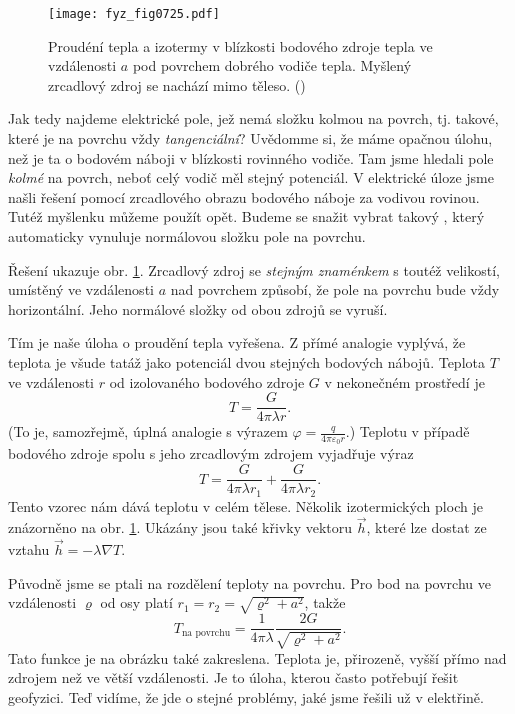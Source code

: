     \begin{figure}[ht!] %
      \centering
      \texttt{[image: fyz\_fig0725.pdf]}
      \caption{Proudéní tepla a izotermy v blízkosti bodového zdroje tepla ve vzdálenosti \(a\) pod
        povrchem dobrého vodiče tepla. Myšlený zrcadlový zdroj se nachází mimo těleso.
        (\cite[s.~210]{Feynman02})}
      \label{fyz:fig0725}
    \end{figure}

    Jak tedy najdeme elektrické pole, jež nemá složku kolmou na povrch, tj. takové, které je na
    povrchu vždy \emph{tangenciální}? Uvědomme si, že máme opačnou úlohu, než je ta o bodovém náboji
    v blízkosti rovinného vodiče. Tam jsme hledali pole \emph{kolmé} na povrch, neboť celý vodič měl
    stejný potenciál. V elektrické úloze jsme našli řešení pomocí zrcadlového obrazu bodového náboje
    za vodivou rovinou. Tutéž myšlenku můžeme použít opět. Budeme se snažit vybrat takový
    , který automaticky vynuluje normálovou složku pole na povrchu.

    Řešení ukazuje obr. \ref{fyz:fig0725}. Zrcadlový zdroj se \emph{stejným znaménkem} s toutéž
    velikostí, umístěný ve vzdálenosti \(a\) nad povrchem způsobí, že pole na povrchu bude vždy
    horizontální. Jeho normálové složky od obou zdrojů se vyruší.

    Tím je naše úloha o proudění tepla vyřešena. Z přímé analogie vyplývá, že teplota je všude tatáž
    jako potenciál dvou stejných bodových nábojů. Teplota \(T\) ve vzdálenosti \(r\) od izolovaného
    bodového zdroje \(G\) v nekonečném prostředí je
    \begin{equation}\label{fyz:eq769}
      T = \dfrac{G}{4\pi\lambda r}.
    \end{equation}
    (To je, samozřejmě, úplná analogie s výrazem \(\varphi = \frac{q}{4\pi\varepsilon_0r}\).)
    Teplotu v případě bodového zdroje spolu s jeho zrcadlovým zdrojem vyjadřuje výraz 
    \begin{equation}\label{fyz:eq770}
      T = \dfrac{G}{4\pi\lambda r_1} + \dfrac{G}{4\pi\lambda r_2}.
    \end{equation}
    Tento vzorec nám dává teplotu v celém tělese. Několik izotermických ploch je znázorněno na obr.
    \ref{fyz:fig0725}. Ukázány jsou také křivky vektoru \(\vec{h}\), které lze dostat ze vztahu
    \(\vec{h} = -\lambda\nabla T\).
    
    Původně jsme se ptali na rozdělení teploty na povrchu. Pro bod na povrchu ve vzdálenosti
    \(\varrho\) od osy platí \(r_1= r_2 = \sqrt{\varrho^2 + a^2}\), takže
    \begin{equation}\label{fyz:eq771}
      T_{\text{na povrchu}} = \dfrac{1}{4\pi\lambda}\dfrac{2G}{\sqrt{\varrho^2 + a^2}}.
    \end{equation}
    Tato funkce je na obrázku také zakreslena. Teplota je, přirozeně, vyšší přímo nad zdrojem než 
    ve větší vzdálenosti. Je to úloha, kterou často potřebují řešit geofyzici. Teď vidíme, že jde o
    stejné problémy, jaké jsme řešili už v elektřině.

